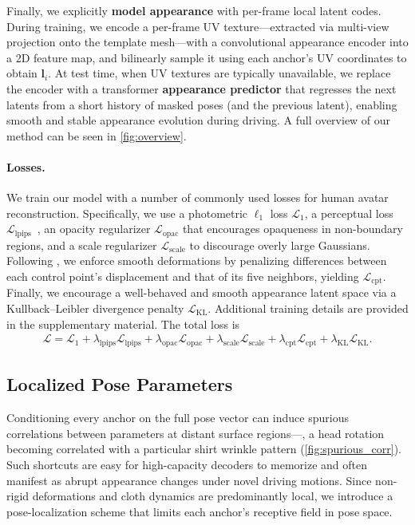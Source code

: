 \documentclass[runningheads]{llncs}
\newcommand{\vect}[1]{\boldsymbol{\mathbf{#1}}}
\newcommand{\losslam}[1]{\lambda_{\text{#1}}}
\newcommand{\lossL}[1]{\mathcal{L}_{\text{#1}}}
\newcommand{\lossterm}[1]{\losslam{#1}\lossL{#1}}
\begin{document}
Finally, we explicitly \textbf{model appearance} with per-frame local latent codes.
During training, we encode a per-frame UV texture---extracted via multi-view projection onto the template mesh---with a convolutional appearance encoder into a 2D feature map, and bilinearly sample it using each anchor's UV coordinates to obtain $\vect{l}_i$.
At test time, when UV textures are typically unavailable, we replace the encoder with a transformer \textbf{appearance predictor} that regresses the next latents from a short history of masked poses (and the previous latent), enabling smooth and stable appearance evolution during driving.
A full overview of our method can be seen in \cref{fig:overview}.

\paragraph{Losses.}

We train our model with a number of commonly used losses for human avatar reconstruction.
Specifically, we use a photometric $\ell_1$ loss $\lossL{1}$, a perceptual loss $\lossL{lpips}$~\cite{wang2004ssim}, an opacity regularizer $\lossL{opac}$ that encourages opaqueness in non-boundary regions, and a scale regularizer $\lossL{scale}$ to discourage overly large Gaussians.
Following \cite{zhan2025spatialmlps}, we enforce smooth deformations by penalizing differences between each control point's displacement and that of its five neighbors, yielding $\lossL{cpt}$.
Finally, we encourage a well-behaved and smooth appearance latent space via a Kullback--Leibler divergence penalty $\lossL{KL}$.
Additional training details are provided in the supplementary material.
The total loss is
%
\begin{align}
    \mathcal{L}= \lossL{1} + \lossterm{lpips} + \lossterm{opac} + \lossterm{scale} + \lossterm{cpt} + \lossterm{KL}.
\end{align}


\subsection{Localized Pose Parameters}
\label{subsec:method_localization}

Conditioning every anchor on the full pose vector can induce spurious correlations between parameters at distant surface regions---\eg, a head rotation becoming correlated with a particular shirt wrinkle pattern (\cref{fig:spurious_corr}).
Such shortcuts are easy for high-capacity decoders to memorize and often manifest as abrupt appearance changes under novel driving motions.
Since non-rigid deformations and cloth dynamics are predominantly local, we introduce a pose-localization scheme that limits each anchor's receptive field in pose space.
\end{document}
